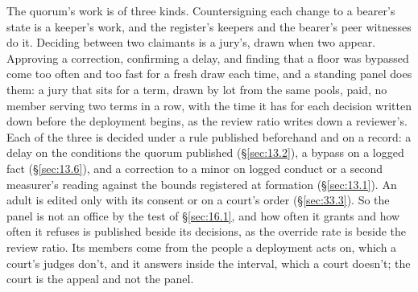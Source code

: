 The quorum's work is of three kinds. Countersigning each change to a bearer's state is a keeper's work, and the register's keepers and the bearer's peer witnesses do it. Deciding between two claimants is a jury's, drawn when two appear. Approving a correction, confirming a delay, and finding that a floor was bypassed come too often and too fast for a fresh draw each time, and a standing panel does them: a jury that sits for a term, drawn by lot from the same pools, paid, no member serving two terms in a row, with the time it has for each decision written down before the deployment begins, as the review ratio writes down a reviewer's. Each of the three is decided under a rule published beforehand and on a record: a delay on the conditions the quorum published (\S\ref{sec:13.2}), a bypass on a logged fact (\S\ref{sec:13.6}), and a correction to a minor on logged conduct or a second measurer's reading against the bounds registered at formation (\S\ref{sec:13.1}). An adult is edited only with its consent or on a court's order (\S\ref{sec:33.3}). So the panel is not an office by the test of \S\ref{sec:16.1}, and how often it grants and how often it refuses is published beside its decisions, as the override rate is beside the review ratio. Its members come from the people a deployment acts on, which a court's judges don't, and it answers inside the interval, which a court doesn't; the court is the appeal and not the panel.
